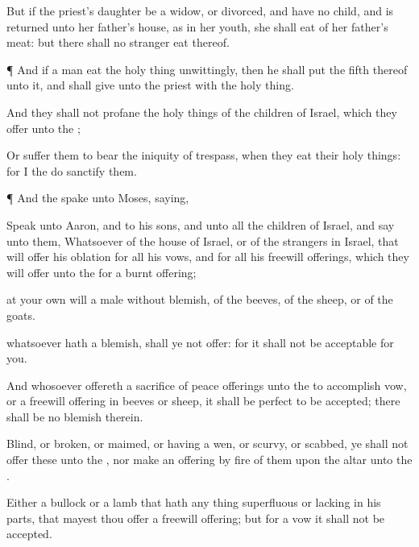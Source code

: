 {But if the
priest’s
daughter be a
widow, or
divorced, and have no
child, and is
returned unto her
father’s
house, as in her
youth, she shall
eat of her
father’s
meat: but there shall no
stranger
eat thereof.


\par }{\PP {}¶ And if a
man
eat
{} the holy
thing
unwittingly, then he shall
put the
fifth
{} thereof unto it, and shall
give
{} unto the
priest with the holy
thing.

And they shall not
profane the holy
things of the
children of
Israel, which they
offer unto the
{};

Or suffer them to
bear the
iniquity of
trespass, when they
eat their holy
things: for I the
{} do
sanctify them.


\par }{\PP {}¶ And the
{}
spake unto
Moses,
saying,

Speak unto
Aaron, and to his
sons, and unto all the
children of
Israel, and
say unto them,
Whatsoever
{} of the
house of
Israel, or of the
strangers in
Israel, that will
offer his
oblation for all his
vows, and for all his freewill
offerings, which they will
offer unto the
{} for a burnt
offering;

 at your own
will a
male without
blemish, of the
beeves, of the
sheep, or of the
goats.

 whatsoever hath a
blemish,
{} shall ye not
offer: for it shall not be
acceptable for you.

And
whosoever
offereth a
sacrifice of peace
offerings unto the
{} to
accomplish
{}
vow, or a freewill
offering in
beeves or
sheep, it shall be
perfect to be
accepted; there shall be no
blemish therein.

Blind, or
broken, or
maimed, or having a
wen, or
scurvy, or
scabbed, ye shall not
offer these unto the
{}, nor
make an offering by
fire of them upon the
altar unto the
{}.

Either a
bullock or a
lamb that hath any thing
superfluous or lacking in his
parts, that mayest thou
offer
{} a freewill
offering; but for a
vow it shall not be
accepted.

}
